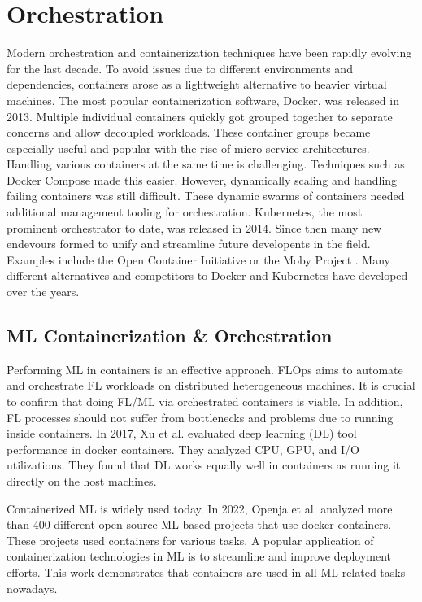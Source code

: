 \section{Orchestration}

Modern orchestration and containerization techniques have been rapidly evolving for the last decade.
To avoid issues due to different environments and dependencies, containers arose as a lightweight alternative to heavier virtual machines.
The most popular containerization software, Docker, was released in 2013.
Multiple individual containers quickly got grouped together to separate concerns and allow decoupled workloads.
These container groups became especially useful and popular with the rise of micro-service architectures.
Handling various containers at the same time is challenging.
Techniques such as Docker Compose made this easier.
However, dynamically scaling and handling failing containers was still difficult.
These dynamic swarms of containers needed additional management tooling for orchestration.
Kubernetes, the most prominent orchestrator to date, was released in 2014.
Since then many new endevours formed to unify and streamline future developents in the field.
Examples include the Open Container Initiative \cite{open_container_initiative} or the Moby Project \cite{moby_project}.
Many different alternatives and competitors to Docker and Kubernetes have developed over the years.

\subsection{ML Containerization \& Orchestration}

Performing ML in containers is an effective approach.
FLOps aims to automate and orchestrate FL workloads on distributed heterogeneous machines.
It is crucial to confirm that doing FL/ML via orchestrated containers is viable.
In addition, FL processes should not suffer from bottlenecks and problems due to running inside containers.
In 2017, Xu et al. \cite{paper:dl_via_docker} evaluated deep learning (DL) tool performance in docker containers.
They analyzed CPU, GPU, and I/O utilizations.
They found that DL works equally well in containers as running it directly on the host machines.

Containerized ML is widely used today.
In 2022, Openja et al. \cite{paper:ml_practices_on_docker} analyzed more than 400 different open-source ML-based projects that use docker containers.
These projects used containers for various tasks.
A popular application of containerization technologies in ML is to streamline and improve deployment efforts.
This work demonstrates that containers are used in all ML-related tasks nowadays.


